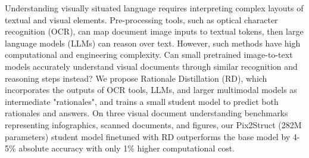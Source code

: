 Understanding visually situated language requires interpreting complex layouts of textual and visual elements.  Pre-processing tools, such as optical character recognition (OCR), can map document image inputs to textual tokens, then large language models (LLMs) can reason over text. However, such methods have high computational and engineering complexity.  Can small pretrained image-to-text models accurately understand visual documents through similar recognition and reasoning steps instead? We propose Rationale Distillation (RD), which incorporates the outputs of OCR tools, LLMs, and larger multimodal models as intermediate "rationales", and trains a small student model to predict both rationales and answers.  On three visual document understanding benchmarks representing infographics, scanned documents, and figures, our Pix2Struct (282M parameters) student model finetuned with RD outperforms the base model by 4-5\% absolute accuracy with only 1\% higher computational cost.